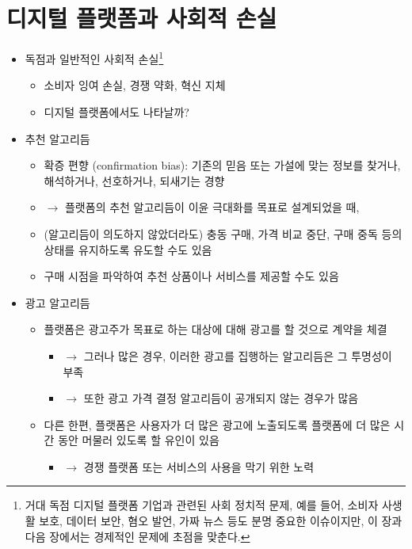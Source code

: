 \section{디지털 플랫폼과 사회적  손실}
\begin{itemize}
\item 독점과 일반적인 사회적 손실\footnote{거대 독점 디지털 플랫폼 기업과 관련된 사회 정치적 문제, 예를 들어, 소비자 사생활 보호, 데이터 보안, 혐오 발언, 가짜 뉴스 등도 분명 중요한 이슈이지만, 이 장과 다음 장에서는 경제적인 문제에 초점을 맞춘다.}
	\begin{itemize}
	\item 소비자 잉여 손실, 경쟁 약화, 혁신 지체
	\item 디지털 플랫폼에서도 나타날까?
	\end{itemize}
\item 추천 알고리듬
	\begin{itemize}
	\item 확증 편향 (confirmation bias): 기존의 믿음 또는 가설에 맞는 정보를 찾거나, 해석하거나, 선호하거나, 되새기는 경향
	\item $\rightarrow$ 플랫폼의 추천 알고리듬이 이윤 극대화를 목표로 설계되었을 때, 
	\item (알고리듬이 의도하지 않았더라도) 충동 구매, 가격 비교 중단, 구매 중독 등의 상태를 유지하도록 유도할 수도 있음 \citep{Allcott:2020wv,Allcott:2021vp}
	\item 구매 시점을 파악하여 추천 상품이나 서비스를 제공할 수도 있음
	\end{itemize}
\item 광고 알고리듬
	\begin{itemize}
	\item 플랫폼은 광고주가 목표로 하는 대상에 대해 광고를 할 것으로 계약을 체결 
		\begin{itemize}
		\item $\rightarrow$ 그러나 많은 경우, 이러한 광고를 집행하는 알고리듬은 그 투명성이 부족
		\item $\rightarrow$ 또한 광고 가격 결정 알고리듬이 공개되지 않는 경우가 많음
		\end{itemize}
	\item 다른 한편, 플랫폼은 사용자가 더 많은 광고에 노출되도록 플랫폼에 더 많은 시간 동안 머물러 있도록 할 유인이 있음
		\begin{itemize}
		\item $\rightarrow$ 경쟁 플랫폼 또는 서비스의 사용을 막기 위한 노력
		\end{itemize}
	\end{itemize}

\end{itemize}
